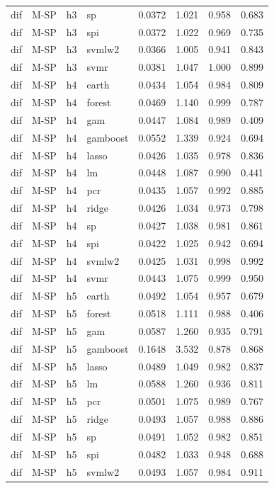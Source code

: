 \begin{ThreePartTable}
\begin{longtable}[t]{llclcccc}
dif & M-SP & h3 & sp & 0.0372 & 1.021 & 0.958 & 0.683\\
dif & M-SP & h3 & spi & 0.0372 & 1.022 & 0.969 & 0.735\\
dif & M-SP & h3 & svmlw2 & 0.0366 & 1.005 & 0.941 & 0.843\\
dif & M-SP & h3 & svmr & 0.0381 & 1.047 & 1.000 & 0.899\\
\addlinespace
dif & M-SP & h4 & earth & 0.0434 & 1.054 & 0.984 & 0.809\\
dif & M-SP & h4 & forest & 0.0469 & 1.140 & 0.999 & 0.787\\
dif & M-SP & h4 & gam & 0.0447 & 1.084 & 0.989 & 0.409\\
dif & M-SP & h4 & gamboost & 0.0552 & 1.339 & 0.924 & 0.694\\
dif & M-SP & h4 & lasso & 0.0426 & 1.035 & 0.978 & 0.836\\
dif & M-SP & h4 & lm & 0.0448 & 1.087 & 0.990 & 0.441\\
dif & M-SP & h4 & pcr & 0.0435 & 1.057 & 0.992 & 0.885\\
dif & M-SP & h4 & ridge & 0.0426 & 1.034 & 0.973 & 0.798\\
dif & M-SP & h4 & sp & 0.0427 & 1.038 & 0.981 & 0.861\\
dif & M-SP & h4 & spi & 0.0422 & 1.025 & 0.942 & 0.694\\
dif & M-SP & h4 & svmlw2 & 0.0425 & 1.031 & 0.998 & 0.992\\
dif & M-SP & h4 & svmr & 0.0443 & 1.075 & 0.999 & 0.950\\
\addlinespace
dif & M-SP & h5 & earth & 0.0492 & 1.054 & 0.957 & 0.679\\
dif & M-SP & h5 & forest & 0.0518 & 1.111 & 0.988 & 0.406\\
dif & M-SP & h5 & gam & 0.0587 & 1.260 & 0.935 & 0.791\\
dif & M-SP & h5 & gamboost & 0.1648 & 3.532 & 0.878 & 0.868\\
dif & M-SP & h5 & lasso & 0.0489 & 1.049 & 0.982 & 0.837\\
dif & M-SP & h5 & lm & 0.0588 & 1.260 & 0.936 & 0.811\\
dif & M-SP & h5 & pcr & 0.0501 & 1.075 & 0.989 & 0.767\\
dif & M-SP & h5 & ridge & 0.0493 & 1.057 & 0.988 & 0.886\\
dif & M-SP & h5 & sp & 0.0491 & 1.052 & 0.982 & 0.851\\
dif & M-SP & h5 & spi & 0.0482 & 1.033 & 0.948 & 0.688\\
dif & M-SP & h5 & svmlw2 & 0.0493 & 1.057 & 0.984 & 0.911\\

\end{longtable}
\end{ThreePartTable}
